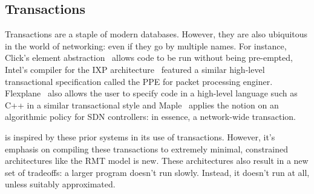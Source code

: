 \subsection{Transactions}
Transactions are a staple of modern databases. However, they are also
ubiquitous in the world of networking: even if they go by multiple names. For
instance, Click's element abstraction~\cite{click} allows code to be run
without being pre-empted, Intel's compiler for the IXP
architecture~\cite{intel} featured a similar high-level transactional
specification called the PPE for packet processing enginer.
Flexplane~\cite{flexplane} also allows the user to specify code in a high-level
language such as C++ in a similar transactional style and Maple~\cite{maple}
applies the notion on an algorithmic policy for SDN controllers: in essence,
a network-wide transaction.

 \pktlanguage{} is inspired by these prior systems in its use of transactions.
However, it's emphasis on compiling these transactions to extremely minimal,
constrained architectures like the RMT model is new. These architectures also
result in a new set of tradeoffs: a larger program doesn't run slowly. Instead,
it doesn't run at all, unless suitably approximated.
